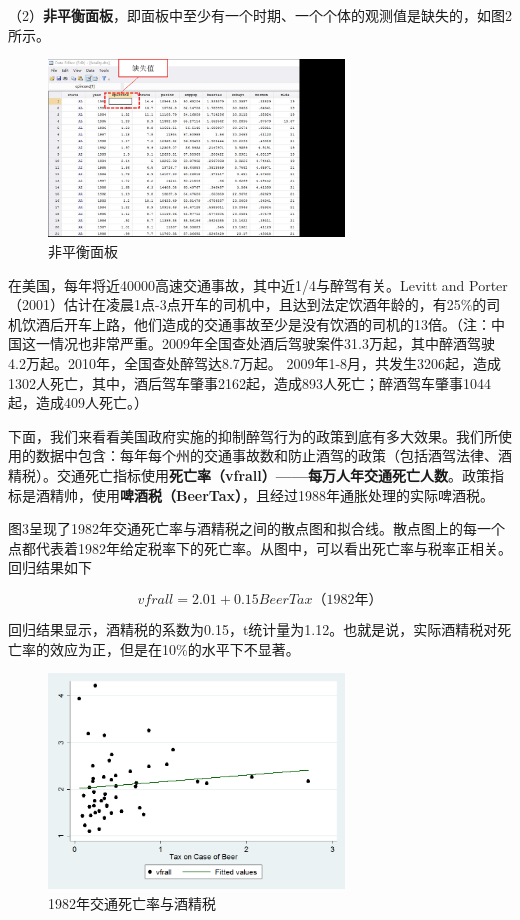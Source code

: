 \documentclass[cn,10pt,math=newtx,citestyle=gb7714-2015,bibstyle=gb7714-2015]{elegantbook}
\begin{document}
（2）\textbf{非平衡面板}，即面板中至少有一个时期、一个个体的观测值是缺失的，如图2所示。
\begin{figure}[htbp]
	\centering
	\includegraphics[width=0.7\textwidth]{unbalancedpanel.jpg}
	\caption{非平衡面板}\label{fig:digit}
\end{figure}

在美国，每年将近40000高速交通事故，其中近1/4与醉驾有关。Levitt and Porter（2001）估计在凌晨1点-3点开车的司机中，且达到法定饮酒年龄的，有25\%的司机饮酒后开车上路，他们造成的交通事故至少是没有饮酒的司机的13倍。（注：中国这一情况也非常严重。2009年全国查处酒后驾驶案件31.3万起，其中醉酒驾驶4.2万起。2010年，全国查处醉驾达8.7万起。 2009年1-8月，共发生3206起，造成1302人死亡，其中，酒后驾车肇事2162起，造成893人死亡；醉酒驾车肇事1044起，造成409人死亡。）

下面，我们来看看美国政府实施的抑制醉驾行为的政策到底有多大效果。我们所使用的数据中包含：每年每个州的交通事故数和防止酒驾的政策（包括酒驾法律、酒精税）。交通死亡指标使用\textbf{死亡率（vfrall）——每万人年交通死亡人数}。政策指标是酒精帅，使用\textbf{啤酒税（BeerTax）}，且经过1988年通胀处理的实际啤酒税。

图3呈现了1982年交通死亡率与酒精税之间的散点图和拟合线。散点图上的每一个点都代表着1982年给定税率下的死亡率。从图中，可以看出死亡率与税率正相关。回归结果如下

\begin{equation}
	vfrall=2.01+0.15BeerTax（1982年）
\end{equation}

回归结果显示，酒精税的系数为0.15，t统计量为1.12。也就是说，实际酒精税对死亡率的效应为正，但是在10\%的水平下不显著。

\begin{figure}[htbp]
	\centering
	\includegraphics[width=0.7\textwidth]{1982.png}
	\caption{1982年交通死亡率与酒精税}\label{fig:digit}
\end{figure}
\end{document}

